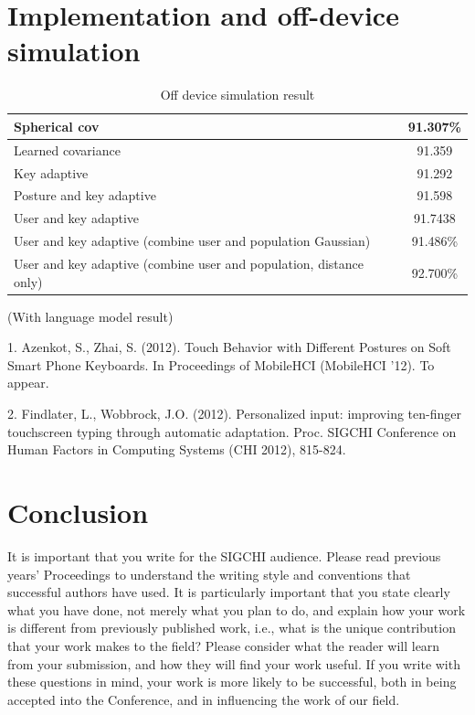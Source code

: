 \documentclass{sigchi}
\begin{document}
\section{Implementation and off-device simulation}
\begin{table}[tb]
  \centering
  \begin{tabularx}{\columnwidth}{|X|c|}
  \hline
  Spherical cov & 91.307\% \\
  \hline
  Learned covariance & 91.359 \\
  \hline
  Key adaptive  & 91.292 \\
  Posture and key adaptive  & 91.598 \\
  User and key adaptive & 91.7438 \\
  User and key adaptive (combine user and population Gaussian)  & 91.486\% \\
  User and key adaptive (combine user and population, distance only) &  92.700\%
  \\
  \end{tabularx}
  \caption{Off device simulation result}
  \label{tab:off-device}
\end{table}


(With language model result)

1. Azenkot, S.,  Zhai, S. (2012). Touch Behavior with Different Postures on Soft Smart Phone Keyboards. In Proceedings of MobileHCI (MobileHCI '12). To appear.

2. Findlater, L., Wobbrock, J.O. (2012). Personalized input: improving ten-finger touchscreen typing through automatic adaptation. Proc. SIGCHI Conference on Human Factors in Computing Systems (CHI 2012), 815-824.
\section{Conclusion}

It is important that you write for the SIGCHI audience.  Please read
previous years' Proceedings to understand the writing style and
conventions that successful authors have used.  It is particularly
important that you state clearly what you have done, not merely what
you plan to do, and explain how your work is different from previously
published work, i.e., what is the unique contribution that your work
makes to the field?  Please consider what the reader will learn from
your submission, and how they will find your work useful.  If you
write with these questions in mind, your work is more likely to be
successful, both in being accepted into the Conference, and in
influencing the work of our field.
\end{document}
